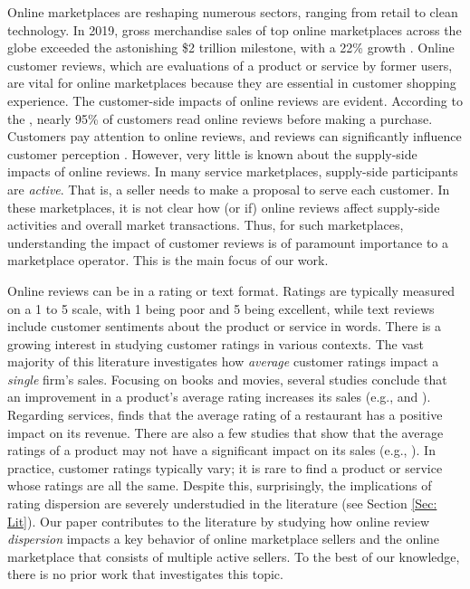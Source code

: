 \documentclass[msom,blindrev]{informs3}
\begin{document}
	
	Online marketplaces are reshaping numerous sectors, ranging from retail to clean technology. In 2019, gross merchandise sales of top online marketplaces across the globe exceeded the astonishing \$2 trillion milestone, with a 22\% growth \citep{onlinemarket}. Online customer reviews, which are evaluations of a product or service by former users, are vital for online marketplaces because they are essential in customer shopping experience.  The customer-side impacts of online reviews are evident. According to the \cite{Northwestern}, nearly 95\% of customers read online reviews before making a purchase.
	Customers pay attention to online reviews, and reviews can significantly influence customer perception \citep{askalidis2016value,reviewmatter}. However, very little is known about the supply-side impacts of online reviews. In many service marketplaces, supply-side participants are \emph{active}. That is, a seller needs to make a proposal to serve each customer. In these marketplaces, it is not clear how (or if) online reviews affect supply-side activities and overall market transactions. Thus, for such marketplaces, understanding the impact of customer reviews is of paramount importance to a marketplace operator. This is the main focus of our work.
	
	
	Online reviews can be in a rating or text format. Ratings are typically measured on a 1 to 5 scale, with 1 being poor and 5 being excellent, while text reviews include customer sentiments about the product or service in words.  There is a growing interest in studying customer ratings in various contexts. The vast majority of this literature investigates how \emph{average} customer ratings impact a \emph{single} firm's sales. Focusing on books and movies, several studies conclude that an improvement in a product's average rating increases its sales (e.g., \cite{chintagunta2010effects} and \cite{chevalier2006effect}). Regarding services, \cite{luca2016reviews} finds that the average rating of a restaurant has a positive impact on its revenue. There are also a few studies that show that the average ratings of a product may not have a significant impact on its sales (e.g., \cite{duan2008online}).  In practice, customer ratings typically vary; it is rare to find a product or service whose ratings are all the same. Despite this, surprisingly, the implications of rating dispersion are severely understudied in the literature (see Section \ref{Sec: Lit}). Our paper contributes to the literature by studying how online review \emph{dispersion} impacts  a key behavior of online marketplace sellers and the online marketplace that consists of multiple active sellers. To the best of our knowledge, there is no prior work that investigates this topic.
	
\end{document}

